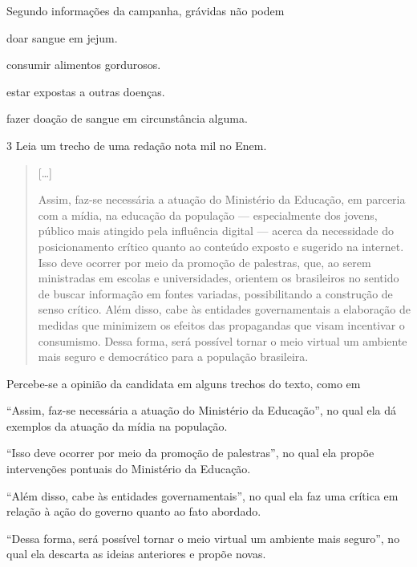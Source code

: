 
\pagebreak
Segundo informações da campanha, grávidas não podem

\begin{escolha}
\item doar sangue em jejum.

\item consumir alimentos gordurosos.

\item estar expostas a outras doenças.

\item fazer doação de sangue em circunstância alguma.
\end{escolha}

\num{3} Leia um trecho de uma redação nota mil no Enem.

\begin{quote}
{[}\ldots{}{]}

Assim, faz-se necessária a atuação do Ministério da Educação, em
parceria com a mídia, na educação da população --- especialmente dos
jovens, público mais atingido pela influência digital --- acerca da
necessidade do posicionamento crítico quanto ao conteúdo exposto e
sugerido na internet. Isso deve ocorrer por meio da promoção de
palestras, que, ao serem ministradas em escolas e universidades,
orientem os brasileiros no sentido de buscar informação em fontes
variadas, possibilitando a construção de senso crítico. Além disso, cabe
às entidades governamentais a elaboração de medidas que minimizem os
efeitos das propagandas que visam incentivar o consumismo. Dessa forma,
será possível tornar o meio virtual um ambiente mais seguro e
democrático para a população brasileira.

\end{quote}

Percebe-se a opinião da candidata em alguns trechos do texto, como em

\begin{escolha}
\item ``Assim, faz-se necessária a atuação do Ministério da Educação'', no
qual ela dá exemplos da atuação da mídia na população.

\item ``Isso deve ocorrer por meio da promoção de palestras'', no qual ela
propõe intervenções pontuais do Ministério da Educação.

\item ``Além disso, cabe às entidades governamentais'', no qual ela faz
uma crítica em relação à ação do governo quanto ao fato abordado.

\item ``Dessa forma, será possível tornar o meio virtual um ambiente mais
seguro'', no qual ela descarta as ideias anteriores e propõe novas.
\end{escolha}


